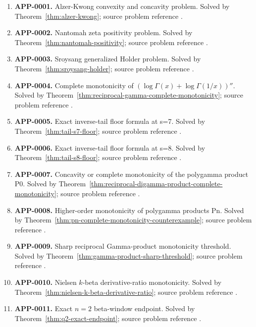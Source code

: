 \documentclass[11pt]{article}
\numberwithin{equation}{section}
\theoremstyle{definition}
\theoremstyle{remark}
\newcommand{\1}{\mathbf 1}
\begin{document}
\begin{enumerate}
\item \label{ledger:app-0001}\textbf{APP-0001.} Alzer-Kwong convexity and concavity problem. Solved by Theorem~\ref{thm:alzer-kwong}; source problem reference \cite{app-app-0001-source}.
\item \label{ledger:app-0002}\textbf{APP-0002.} Nantomah zeta positivity problem. Solved by Theorem~\ref{thm:nantomah-positivity}; source problem reference \cite{nantomah}.
\item \label{ledger:app-0003}\textbf{APP-0003.} Sroysang generalized Holder problem. Solved by Theorem~\ref{thm:sroysang-holder}; source problem reference \cite{sroysang}.
\item \label{ledger:app-0004}\textbf{APP-0004.} Complete monotonicity of \((\log\Gamma(x)+\log\Gamma(1/x))''\). Solved by Theorem~\ref{thm:reciprocal-gamma-complete-monotonicity}; source problem reference \cite{app-app-0004-source}.
\item \label{ledger:app-0005}\textbf{APP-0005.} Exact inverse-tail floor formula at s=7. Solved by Theorem~\ref{thm:tail-s7-floor}; source problem reference \cite{kim-song-tail}.
\item \label{ledger:app-0006}\textbf{APP-0006.} Exact inverse-tail floor formula at s=8. Solved by Theorem~\ref{thm:tail-s8-floor}; source problem reference \cite{kim-song-tail}.
\item \label{ledger:app-0007}\textbf{APP-0007.} Concavity or complete monotonicity of the polygamma product P0. Solved by Theorem~\ref{thm:reciprocal-digamma-product-complete-monotonicity}; source problem reference \cite{app-app-0004-source}.
\item \label{ledger:app-0008}\textbf{APP-0008.} Higher-order monotonicity of polygamma products Pn. Solved by Theorem~\ref{thm:pn-complete-monotonicity-counterexample}; source problem reference \cite{app-app-0004-source}.
\item \label{ledger:app-0009}\textbf{APP-0009.} Sharp reciprocal Gamma-product monotonicity threshold. Solved by Theorem~\ref{thm:gamma-product-sharp-threshold}; source problem reference \cite{app-app-0009-source}.
\item \label{ledger:app-0010}\textbf{APP-0010.} Nielsen \(k\)-beta derivative-ratio monotonicity. Solved by Theorem~\ref{thm:nielsen-k-beta-derivative-ratio}; source problem reference \cite{yin-zhang-k-beta}.
\item \label{ledger:app-0011}\textbf{APP-0011.} Exact \(n=2\) beta-window endpoint. Solved by Theorem~\ref{thm:q2-exact-endpoint}; source problem reference \cite{app-app-0004-source}.

\end{enumerate}
\end{document}
